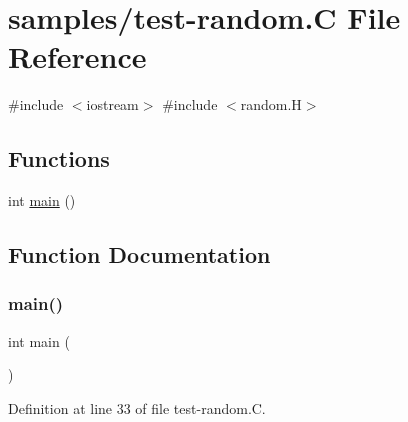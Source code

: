 \hypertarget{test-random_8_c}{}\section{samples/test-\/random.C File Reference}
\label{test-random_8_c}
{\ttfamily \#include $<$iostream$>$}\newline
{\ttfamily \#include $<$random.\+H$>$}\newline
\subsection*{Functions}
\begin{DoxyCompactItemize}
\item 
int \hyperlink{test-random_8_c_ae66f6b31b5ad750f1fe042a706a4e3d4}{main} ()
\end{DoxyCompactItemize}


\subsection{Function Documentation}
\mbox{\label{test-random_8_c_ae66f6b31b5ad750f1fe042a706a4e3d4}} 
\subsubsection{\texorpdfstring{main()}{main()}}
{\footnotesize\ttfamily int main (\begin{DoxyParamCaption}{ }\end{DoxyParamCaption})}



Definition at line 33 of file test-\/random.\+C.

